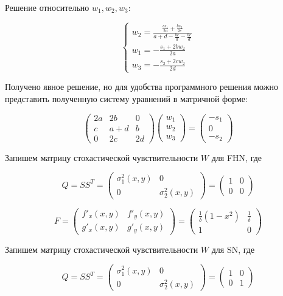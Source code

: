 \documentclass[17pt]{article}
\begin{document}
Решение относительно $w_1, w_2, w_3$:

$$
\begin{cases}
    w_2 = \frac{
        \frac{c s_1}{2a} + \frac{b s_2}{2c}
    }{
        a + d - \frac{b c}{a} - \frac{b c}{d}
    } \\
    w_1 = -\frac{s_1 + 2b w_2}{2a} \\
    w_3 = -\frac{s_2 + 2c w_2}{2d}
\end{cases}
$$

Получено явное решение, но для удобства программного решения можно представить полученную систему уравнений в матричной форме:

$$
\begin{pmatrix}
    2a & 2b & 0 \\
    c & a+d & b \\
    0 & 2c & 2d
\end{pmatrix}
\begin{pmatrix}
    w_1 \\ w_2 \\ w_3
\end{pmatrix}
=
\begin{pmatrix}
    -s_1 \\ 0 \\ -s_2
\end{pmatrix}
$$

Запишем матрицу стохастической чувствительности $W$ для FHN, где

$$
Q = SS^T = 
\begin{pmatrix}
    \sigma_1^2(x, y) & 0 \\
    0 & \sigma_2^2(x, y)
\end{pmatrix}
=
\begin{pmatrix}
    1 & 0 \\
    0 & 0
\end{pmatrix}
$$

$$
F = 
\begin{pmatrix}
    f'_x(x, y) & f'_y(x, y) \\
    g'_x(x, y) & g'_y(x, y)
\end{pmatrix}
=
\begin{pmatrix}
    \frac{1}{\delta} (1 - x^2) & \frac{1}{\delta} \\
    1 & 0
\end{pmatrix}
$$

Запишем матрицу стохастической чувствительности $W$ для SN, где

$$
Q = SS^T = 
\begin{pmatrix}
    \sigma_1^2(x, y) & 0 \\
    0 & \sigma_2^2(x, y)
\end{pmatrix}
=
\begin{pmatrix}
    1 & 0 \\
    0 & 1
\end{pmatrix}
$$
\end{document}

